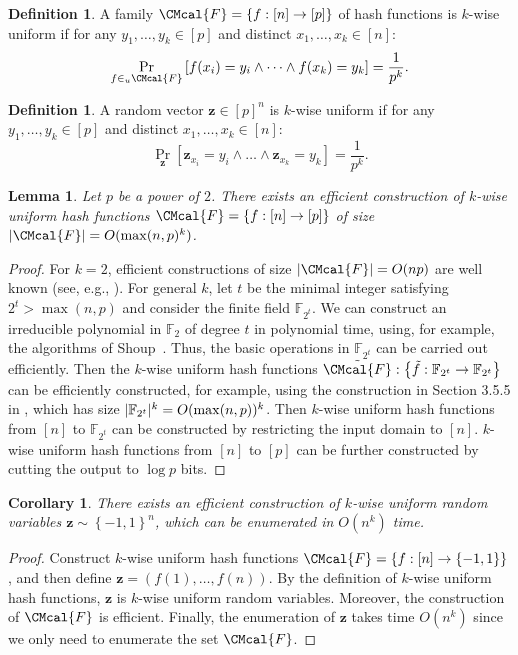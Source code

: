 \documentclass[10pt,a4paper]{article}
\def\F{\CMcal{F}}
\theoremstyle{plain}
\newtheorem{lemma}[theorem]{Lemma}
\newtheorem{cor}[theorem]{Corollary}
\theoremstyle{definition}
\newtheorem{definition}[theorem]{Definition}
\newcommand {\set} [1] {\ensuremath{ \left\lbrace #1 \right\rbrace }}
\newcommand {\Br} [1] {\ensuremath{ \left[ #1 \right] }}
\DeclarePairedDelimiter{\abs}{\lvert}{\rvert}
\newcommand{\randz}{\ensuremath{\mathbf{z}}}
\newcommand{\1}{\mathbb{1}} %
\begin{document}
\begin{definition}
A family $\F=\set{f:[n]\to[p]}$ of hash functions is $k$-wise uniform if for any $y_1, \dots, y_k\in[p]$ and distinct $x_1, \dots, x_k\in[n]$:
\[\Pr_{f\in_u\F}\Br{f(x_i)=y_i\wedge\dots\wedge f(x_k)=y_k}=\frac{1}{p^k}.\]
\end{definition}
\begin{definition}
A random vector $\randz\in[p]^n$ is $k$-wise uniform if for any $y_1,\dots,y_k\in[p]$ and distinct $x_1,\dots,x_k\in[n]$:
\[\Pr_{\randz}\Br{\randz_{x_i}=y_i\wedge\dots\wedge \randz_{x_k}=y_k}=\frac{1}{p^k}.\]
\end{definition}

\begin{lemma}\label{lem:kwise-hash}
  Let $p$ be a power of $2$.
  There exists an efficient construction of $k$-wise uniform hash functions $\F=\set{f: [n]\to[p]}$ of size $\abs{\F}=O(\max(n, p)^k)$.
\end{lemma}
\begin{proof}
  For $k=2$, efficient constructions of size $\abs{\F}=O(np)$ are well known (see, e.g., \cite{10.1145/800105.803400}).
  For general $k$,
let $t$ be the minimal integer satisfying $2^t>\max(n, p)$ and consider the finite field $\mathbb{F}_{2^t}$.
  We can construct an irreducible polynomial in $\mathbb{F}_2$ of degree $t$ in polynomial time,
using, for example, the algorithms of Shoup~\cite{shoup1990new}.
  Thus, the basic operations in $\mathbb{F}_{2^t}$ can be carried out efficiently.
  Then the $k$-wise uniform hash functions $\tilde{\F}: \set{\tilde{f}: \mathbb{F}_{2^t}\to\mathbb{F}_{2^t}}$ can be efficiently constructed,
for example, using the construction in Section 3.5.5 in \cite{TCS-010},
  which has size $\abs{\mathbb{F}_{2^t}}^k=O(\max(n, p))^k$.
  Then $k$-wise uniform hash functions from $[n]$ to $\mathbb{F}_{2^t}$ can be constructed by restricting the input domain to $[n]$.
  $k$-wise uniform hash functions from $[n]$ to $[p]$ can be further constructed by cutting the output to $\log p$ bits.
\end{proof}
\begin{cor}\label{cor:kwise-z}
  There exists an efficient construction of $k$-wise uniform random variables $\randz\sim\set{-1,1}^n$,
which can be enumerated in $O(n^k)$ time.
\end{cor}
\begin{proof}
  Construct $k$-wise uniform hash functions $\F=\set{f: [n]\to\set{-1,1}}$, and then define $\randz=(f(1), \dots, f(n))$.
  By the definition of $k$-wise uniform hash functions,
  $\randz$ is $k$-wise uniform random variables.
  Moreover, the construction of $\F$ is efficient.
  Finally, the enumeration of $\randz$ takes time $O(n^k)$
  since we only need to enumerate the set $\F$.
\end{proof}
\end{document}
